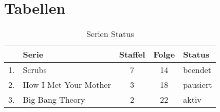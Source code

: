 \section{Tabellen}

\begin{table}[h]
	\begin{center}
	\caption{Serien Status}
		\begin{tabular}{|c l|c|c|l|}
			\hline 
			& Serie & Staffel & Folge & Status \\ 
			\hline
			\hline 
			1. & Scrubs & 7 & 14 & beendet \\ 
			\hline 
			2. & How I Met Your Mother & 3 & 18 & pausiert \\ 
			\hline 
			3. & Big Bang Theory & 2 & 22 & aktiv \\ 
			\hline 
		\end{tabular}
	\end{center}
\end{table}


